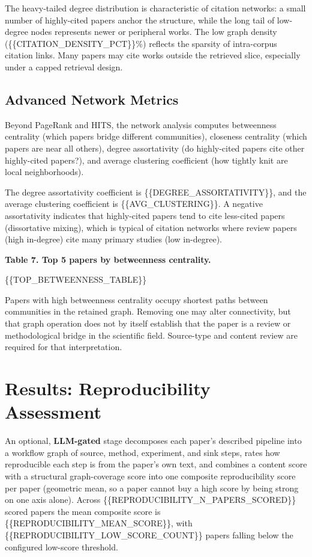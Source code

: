\documentclass[
]{article}
\begin{document}
The heavy-tailed degree distribution is characteristic of citation
networks: a small number of highly-cited papers anchor the structure,
while the long tail of low-degree nodes represents newer or peripheral
works. The low graph density (\{\{CITATION\_DENSITY\_PCT\}\}\%) reflects
the sparsity of intra-corpus citation links. Many papers may cite works
outside the retrieved slice, especially under a capped retrieval design.

\subsection{Advanced Network Metrics}\label{advanced-network-metrics}

Beyond PageRank and HITS, the network analysis computes betweenness
centrality (which papers bridge different communities), closeness
centrality (which papers are near all others), degree assortativity (do
highly-cited papers cite other highly-cited papers?), and average
clustering coefficient (how tightly knit are local neighborhoods).

The degree assortativity coefficient is \{\{DEGREE\_ASSORTATIVITY\}\},
and the average clustering coefficient is \{\{AVG\_CLUSTERING\}\}. A
negative assortativity indicates that highly-cited papers tend to cite
less-cited papers (dissortative mixing), which is typical of citation
networks where review papers (high in-degree) cite many primary studies
(low in-degree).

\textbf{Table 7. Top 5 papers by betweenness centrality.}

\{\{TOP\_BETWEENNESS\_TABLE\}\}

Papers with high betweenness centrality occupy shortest paths between
communities in the retained graph. Removing one may alter connectivity,
but that graph operation does not by itself establish that the paper is
a review or methodological bridge in the scientific field. Source-type
and content review are required for that interpretation.

\newpage

\section{Results: Reproducibility
Assessment}\label{results-reproducibility-assessment}

An optional, \textbf{LLM-gated} stage decomposes each paper's described
pipeline into a workflow graph of source, method, experiment, and sink
steps, rates how reproducible each step is from the paper's own text,
and combines a content score with a structural graph-coverage score into
one composite reproducibility score per paper (geometric mean, so a
paper cannot buy a high score by being strong on one axis alone). Across
\{\{REPRODUCIBILITY\_N\_PAPERS\_SCORED\}\} scored papers the mean
composite score is \{\{REPRODUCIBILITY\_MEAN\_SCORE\}\}, with
\{\{REPRODUCIBILITY\_LOW\_SCORE\_COUNT\}\} papers falling below the
configured low-score threshold.
\end{document}
